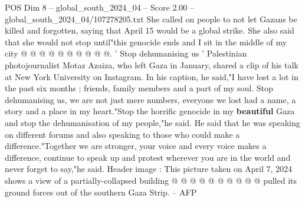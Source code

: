 \begin{textsample}{POS Dim 8 – global\_south\_2024\_04 – Score 2.00 – global\_south\_2024\_04/107278205.txt}
She called on people to not let Gazans be killed and forgotten, saying that April 15 would be a global strike.
She also said that she would not stop until"this genocide ends and I sit in the middle of my city @ @ @ @ @ @ @ @ @ @. ' Stop dehumanising us ' Palestinian photojournalist Motaz Azaiza, who left Gaza in January, shared a clip of his talk at New York University on Instagram.
In his caption, he said,"I have lost a lot in the past six months ; friends, family members and a part of my soul.
Stop dehumanising us, we are not just mere numbers, everyone we lost had a name, a story and a place in my heart."Stop the horrific genocide in my \textbf{beautiful} Gaza and stop the dehumanisation of my people,"he said.
He said that he was speaking on different forums and also speaking to those who could make a difference."Together we are stronger, your voice and every voice makes a difference, continue to speak up and protest wherever you are in the world and never forget to say,"he said.
Header image : This picture taken on April 7, 2024 shows a view of a partially-collapsed building @ @ @ @ @ @ @ @ @ @ pulled its ground forces out of the southern Gaza Strip. -- AFP

\end{textsample}
